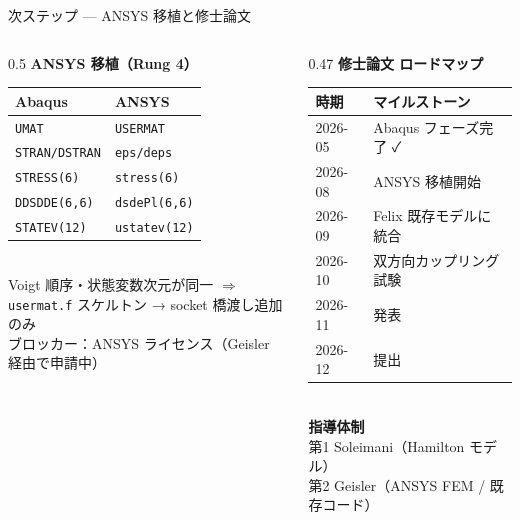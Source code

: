\documentclass[
  ignorenonframetext,
  aspectratio=169,
]{beamer}
\begin{document}
\begin{frame}{次ステップ --- ANSYS 移植と修士論文}
\protect\hypertarget{next-steps}{}

\begin{columns}[T]
\begin{column}{0.5\textwidth}
\textbf{ANSYS 移植（Rung 4）}\\[4pt]
{\small
\begin{tabular}{@{}ll@{}}
\toprule
Abaqus & ANSYS\\
\midrule
\texttt{UMAT} & \texttt{USERMAT}\\
\texttt{STRAN/DSTRAN} & \texttt{eps/deps}\\
\texttt{STRESS(6)} & \texttt{stress(6)}\\
\texttt{DDSDDE(6,6)} & \texttt{dsdePl(6,6)}\\
\texttt{STATEV(12)} & \texttt{ustatev(12)}\\
\bottomrule
\end{tabular}
}\\[6pt]
Voigt 順序・状態変数次元が同一 $\Rightarrow$\\
\texttt{usermat.f} スケルトン → socket 橋渡し追加のみ\\[4pt]
{\footnotesize ブロッカー：ANSYS ライセンス（Geisler 経由で申請中）}
\end{column}
\begin{column}{0.47\textwidth}
\textbf{修士論文 ロードマップ}\\[4pt]
{\small
\begin{tabular}{@{}ll@{}}
\toprule
時期 & マイルストーン\\
\midrule
2026-05 & Abaqus フェーズ完了 ✓\\
2026-08 & ANSYS 移植開始\\
2026-09 & Felix 既存モデルに統合\\
2026-10 & 双方向カップリング試験\\
2026-11 & 発表\\
2026-12 & 提出\\
\bottomrule
\end{tabular}
}\\[8pt]
\textbf{指導体制}\\[2pt]
{\small 第1 Soleimani（Hamilton モデル）\\
第2 Geisler（ANSYS FEM / 既存コード）}
\end{column}
\end{columns}
\end{frame}

\end{document}
